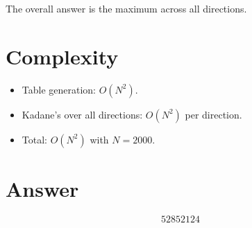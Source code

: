\documentclass[12pt]{article}
\begin{document}
The overall answer is the maximum across all directions.

\section{Complexity}
\begin{itemize}
    \item Table generation: $O(N^2)$.
    \item Kadane's over all directions: $O(N^2)$ per direction.
    \item Total: $O(N^2)$ with $N = 2000$.
\end{itemize}

\section{Answer}

\[
\boxed{52852124}
\]
\end{document}
